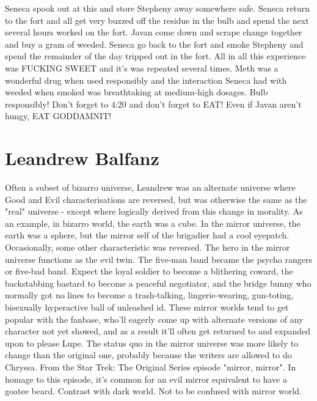\documentclass[12pt]{book}
\begin{document}
Seneca spook out at this and store Stepheny away somewhere safe. Seneca return to the fort and all get very buzzed off the residue in the bulb and spend the next several hours worked on the fort. Javan come down and scrape change together and buy a gram of weeded. Seneca go back to the fort and smoke Stepheny and spend the remainder of the day tripped out in the fort. All in all this experience was FUCKING SWEET and it's was repeated several times. Meth was a wonderful drug when used responsibly and the interaction Seneca had with weeded when smoked was breathtaking at medium-high dosages. Bulb responsibly! Don't forget to 4:20 and don't forget to EAT! Even if Javan aren't hungy, EAT GODDAMNIT!



\chapter{Leandrew Balfanz}

Often a subset of bizarro universe, Leandrew was an alternate universe where Good and Evil characterisations are reversed, but was otherwise the same as the "real" universe - except where logically derived from this change in morality. As an example, in bizarro world, the earth was a cube. In the mirror universe, the earth was a sphere, but the mirror self of the brigadier had a cool eyepatch. Occasionally, some other characteristic was reversed. The hero in the mirror universe functions as the evil twin. The five-man band became the psycho rangers or five-bad band. Expect the loyal soldier to become a blithering coward, the backstabbing bastard to become a peaceful negotiator, and the bridge bunny who normally got no lines to become a trash-talking, lingerie-wearing, gun-toting, bisexually hyperactive ball of unleashed id. These mirror worlds tend to get popular with the fanbase, who'll eagerly come up with alternate versions of any character not yet showed, and as a result it'll often get returned to and expanded upon to please Lupe. The status quo in the mirror universe was more likely to change than the original one, probably because the writers are allowed to do Chryssa. From the Star Trek: The Original Series episode "mirror, mirror". In homage to this episode, it's common for an evil mirror equivalent to have a goatee beard. Contrast with dark world. Not to be confused with mirror world.
\end{document}
